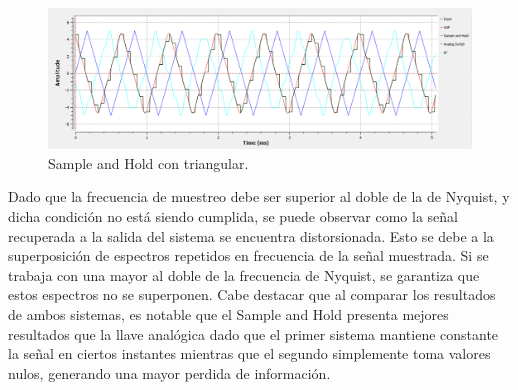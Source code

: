\begin{figure}[H]
\centering
	\includegraphics[width=0.8\linewidth]{ImagenesEjercicio6/6d-TRSH11k.png}
	\caption{Sample and Hold con triangular.}
	\label{fig:trsh}
\end{figure}

Dado que la frecuencia de muestreo debe ser superior al doble de la de Nyquist, y dicha condición no está siendo cumplida, se puede observar como la señal recuperada a la salida del sistema se encuentra distorsionada. Esto se debe a la superposición de espectros repetidos en frecuencia de la señal muestrada. Si se trabaja con una mayor al doble de la frecuencia de Nyquist, se garantiza que estos espectros no se superponen. Cabe destacar que al comparar los resultados de ambos sistemas, es notable que el Sample and Hold presenta mejores resultados que la llave analógica dado que el primer sistema mantiene constante la señal en ciertos instantes mientras que el segundo simplemente toma valores nulos, generando una mayor perdida de información.
